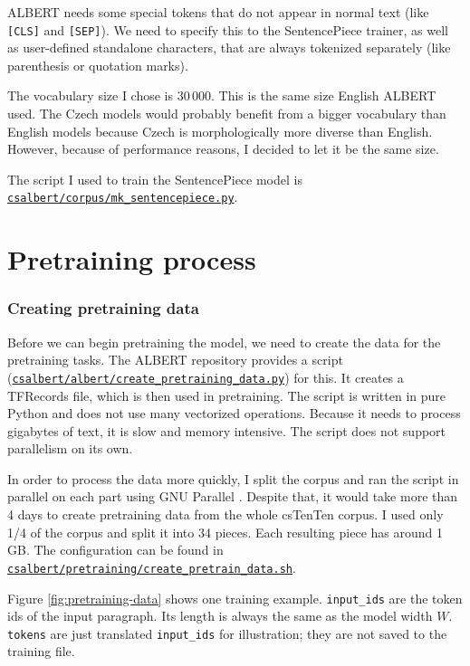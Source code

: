 \documentclass[
  printed, %
  color,   %
  table,   %
  oneside, %
  lof,     %
  lot,     %
]{fithesis3}
\begin{document}
ALBERT needs some special tokens that do not appear in normal text (like \texttt{[CLS]} and \texttt{[SEP]}). We need to specify this to the SentencePiece trainer, as well as user-defined standalone characters, that are always tokenized separately (like parenthesis or quotation marks).

The vocabulary size I chose is 30\,000. This is the same size English ALBERT used. The Czech models would probably benefit from a bigger vocabulary than English models because Czech is morphologically more diverse than English. However, because of performance reasons, I decided to let it be the same size.

The script I used to train the SentencePiece model is \newline
\href{https://github.com/ZepZep/csalbert/blob/master/corpus/mk_sentencepiece.py}{\texttt{csalbert/corpus/mk\_sentencepiece.py}}.

\section{Pretraining process}
\subsubsection{Creating pretraining data}
Before we can begin pretraining the model, we need to create the data for the pretraining tasks. The ALBERT repository provides a script (\href{https://github.com/ZepZep/csalbert/blob/master/albert/create_pretraining_data.py} {\texttt{csalbert/albert/create\_pretraining\_data.py}}) for this. It creates a TFRecords file, which is then used in pretraining. The script is written in pure Python and does not use many vectorized operations. Because it needs to process gigabytes of text, it is slow and memory intensive. The script does not support parallelism on its own.

In order to process the data more quickly, I split the corpus and ran the script in parallel on each part using GNU Parallel \parencite{parallel}. Despite that, it would take more than 4 days to create pretraining data from the whole csTenTen corpus. I used only 1/4 of the corpus and split it into 34 pieces. Each resulting piece has around 1 GB. The configuration can be found in \href{https://github.com/ZepZep/csalbert/blob/master/pretraining/create_pretrain_data.sh}{\texttt{csalbert/pretraining/create\_pretrain\_data.sh}}.

Figure \ref{fig:pretraining-data} shows one training example. \texttt{input\_ids} are the token ids of the input paragraph. Its length is always the same as the model width $W$. \texttt{tokens} are just translated \texttt{input\_ids} for illustration; they are not saved to the training file.
\end{document}
